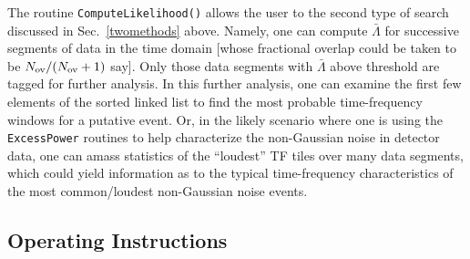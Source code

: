 \documentclass{article}
\begin{document}
The routine \verb+ComputeLikelihood()+ allows the user to the second
type of search discussed in Sec.\ \ref{twomethods} above.  Namely, one
can compute ${\bar \Lambda}$ for successive segments of data in the
time domain [whose fractional overlap could be taken to be $N_{\rm ov} /
(N_{\rm ov} +1)$ say].  Only those data segments with ${\bar \Lambda}$
above threshold are tagged for further analysis.  In this further
analysis, one can examine the first few elements of the sorted linked
list to find the most probable time-frequency windows for a putative
event.  Or, in the likely scenario where one is using the
\verb+ExcessPower+ routines to help characterize the non-Gaussian
noise in detector data, one can 
amass statistics of the ``loudest'' TF tiles over many data segments,
which could yield information as to the typical time-frequency
characteristics of the most common/loudest non-Gaussian noise events.







\subsection{Operating Instructions}

\end{document}
